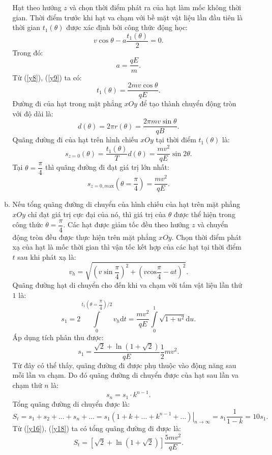 \begin{loigiai}
\begin{enumerate}[1)]
\begin{enumerate}[a)]
Hạt theo hướng $z$ và chọn  thời điểm phát ra của hạt làm mốc không thời gian. Thời điểm trước khi hạt va chạm với bề mặt vật liệu lần đầu tiên là thời gian ${{t}_{1}}\left( \theta  \right)$ được xác định bởi công thức động học:
\[v\cos \theta -a\dfrac{{{t}_{1}}\left( \theta  \right)}{2}=0. \tag{8} \label{y8}\] 
Trong đó: \[a=\dfrac{qE}{m}. \tag{9} \label{y9}\]  Từ (\ref{y8}), (\ref{y9}) ta có: \[{{t}_{1}}\left( \theta  \right)=\dfrac{2mv\cos \theta }{qE}. \tag{10}\] 
Đường đi của hạt trong mặt phẳng $xOy$ để tạo thành chuyển động tròn với độ dài là:
\[d\left( \theta  \right)=2\pi r\left( \theta  \right)=\dfrac{2\pi mv\sin \theta }{qB}. \tag{11}\] 
Quãng đường đi của hạt trên hình chiếu $xOy$ tại thời điểm ${{t}_{1}}\left( \theta  \right)$ là:
\[{{s}_{z=0}}\left( \theta  \right)=\dfrac{{{t}_{1}}\left( \theta  \right)}{T}d\left( \theta  \right)=\dfrac{m{{v}^{2}}}{qE}\sin 2\theta. \tag{12} \] 
Tại $\theta =\dfrac{\pi }{4}$ thì quãng đường đi đạt giá trị lớn nhất:  \[{{s}_{z=0,m\text{ax}}}\left( \theta =\dfrac{\pi }{4} \right)=\dfrac{m{{v}^{2}}}{qE}. \tag{13}\] 
\item Nếu tổng quãng đường di chuyển của hình chiếu của hạt trên mặt phẳng $xOy$ chỉ đạt giá trị cực đại của nó, thì giá trị của $\theta$ được thể hiện trong công thức $\theta =\dfrac{\pi }{4}$. Các hạt được giảm tốc đều theo hướng $z$ và chuyển động tròn đều được thực hiện trên mặt phẳng $xOy$. Chọn thời điểm phát xạ của hạt là mốc thời gian thì vận tốc kết hợp của các hạt tại thời điểm $t$ sau khi phát xạ là:
\[{{v}_{h}}=\sqrt{{{\left( v\sin \dfrac{\pi }{4} \right)}^{2}}+{{\left( vc\text{os}\dfrac{\pi }{4}-at \right)}^{2}}}. \tag{14}\] 
Quãng đường hạt di chuyển cho đến khi va chạm với tấm vật liệu lần thứ $1$ là:
\[{{s}_{1}}=2\int\limits_{0}^{{{t}_{1}}\left( \theta =\dfrac{\pi }{4} \right)/2}{{{v}_{h}}\mathrm{d}t}=\dfrac{m{{v}^{2}}}{qE}\int\limits_{0}^{1}{\sqrt{1+{{u}^{2}}}\mathrm{d}u}. \tag{15}\] 
Áp dụng tích phân thu được: \[{{s}_{1}}=\dfrac{\sqrt{2}+\ln \left( 1+\sqrt{2} \right)}{qE}\dfrac{1}{2}m{{v}^{2}}. \tag{16} \label{y16}\] 
Từ đây có thể thấy, quãng đường đi được phụ thuộc vào động năng sau mỗi lần va chạm. Do đó quãng đường di chuyển được của hạt sau lần va chạm thứ $n$ là: \[{{s}_{n}}={{s}_{1}}\cdot{{k}^{n-1}}. \tag{17}\]
Tổng quãng đường di chuyển được là:
\[{{S}_{t}}={{s}_{1}}+{{s}_{2}}+...+{{s}_{n}}+...={{\left. {{s}_{1}}\left( 1+k+...+{{k}^{n-1}}+... \right) \right|}_{n\to \infty }}={{s}_{1}}\dfrac{1}{1-k}=10{{s}_{1}}. \tag{18} \label{y18}\]
Từ (\ref{y16}), (\ref{y18}) ta có tổng quãng đường đi được là: \[{{S}_{t}}=\left[ \sqrt{2}+\ln \left( 1+\sqrt{2} \right) \right]\dfrac{5m{{v}^{2}}}{qE}. \tag{19}\] 
\end{enumerate}
    \end{enumerate}
    \end{loigiai}
    
